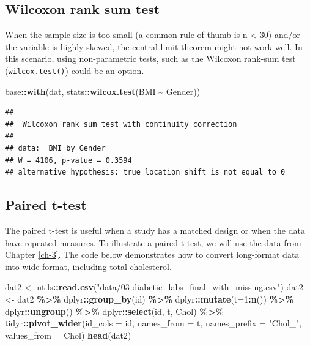 \documentclass[
]{book}
\newenvironment{Shaded}{\begin{snugshade}}{\end{snugshade}}
\newcommand{\AttributeTok}[1]{\textcolor[rgb]{0.13,0.29,0.53}{#1}}
\newcommand{\DecValTok}[1]{\textcolor[rgb]{0.00,0.00,0.81}{#1}}
\newcommand{\FunctionTok}[1]{\textcolor[rgb]{0.13,0.29,0.53}{\textbf{#1}}}
\newcommand{\NormalTok}[1]{#1}
\newcommand{\OtherTok}[1]{\textcolor[rgb]{0.56,0.35,0.01}{#1}}
\newcommand{\SpecialCharTok}[1]{\textcolor[rgb]{0.81,0.36,0.00}{\textbf{#1}}}
\newcommand{\StringTok}[1]{\textcolor[rgb]{0.31,0.60,0.02}{#1}}
\begin{document}
\subsection{Wilcoxon rank sum test}\label{wilcoxon-rank-sum-test}

When the sample size is too small (a common rule of thumb is n \textless{} 30) and/or the variable is highly skewed, the central limit theorem might not work well. In this scenario, using non-parametric tests, such as the Wilcoxon rank-sum test (\texttt{wilcox.test()}) could be an option.

\begin{Shaded}
\begin{Highlighting}[]
\NormalTok{base}\SpecialCharTok{::}\FunctionTok{with}\NormalTok{(dat, stats}\SpecialCharTok{::}\FunctionTok{wilcox.test}\NormalTok{(BMI }\SpecialCharTok{\textasciitilde{}}\NormalTok{ Gender))}
\end{Highlighting}
\end{Shaded}

\begin{verbatim}
## 
##  Wilcoxon rank sum test with continuity correction
## 
## data:  BMI by Gender
## W = 4106, p-value = 0.3594
## alternative hypothesis: true location shift is not equal to 0
\end{verbatim}

\subsection{Paired t-test}\label{paired-t-test}

The paired t-test is useful when a study has a matched design or when the data have repeated measures. To illustrate a paired t-test, we will use the data from Chapter \ref{ch-3}. The code below demonstrates how to convert long-format data into wide format, including total cholesterol.

\begin{Shaded}
\begin{Highlighting}[]
\NormalTok{dat2 }\OtherTok{\textless{}{-}}\NormalTok{ utils}\SpecialCharTok{::}\FunctionTok{read.csv}\NormalTok{(}\StringTok{"data/03{-}diabetic\_labs\_final\_with\_missing.csv"}\NormalTok{)   }
\NormalTok{dat2 }\OtherTok{\textless{}{-}}\NormalTok{ dat2 }\SpecialCharTok{\%\textgreater{}\%} 
\NormalTok{  dplyr}\SpecialCharTok{::}\FunctionTok{group\_by}\NormalTok{(id) }\SpecialCharTok{\%\textgreater{}\%}
\NormalTok{  dplyr}\SpecialCharTok{::}\FunctionTok{mutate}\NormalTok{(}\AttributeTok{t=}\DecValTok{1}\SpecialCharTok{:}\FunctionTok{n}\NormalTok{()) }\SpecialCharTok{\%\textgreater{}\%}
\NormalTok{  dplyr}\SpecialCharTok{::}\FunctionTok{ungroup}\NormalTok{() }\SpecialCharTok{\%\textgreater{}\%}
\NormalTok{  dplyr}\SpecialCharTok{::}\FunctionTok{select}\NormalTok{(id, t, Chol) }\SpecialCharTok{\%\textgreater{}\%}
\NormalTok{  tidyr}\SpecialCharTok{::}\FunctionTok{pivot\_wider}\NormalTok{(}\AttributeTok{id\_cols =}\NormalTok{ id, }\AttributeTok{names\_from =}\NormalTok{ t, }\AttributeTok{names\_prefix =} \StringTok{"Chol\_"}\NormalTok{, }
    \AttributeTok{values\_from =}\NormalTok{ Chol)}
\FunctionTok{head}\NormalTok{(dat2)}
\end{Highlighting}
\end{Shaded}
\end{document}
